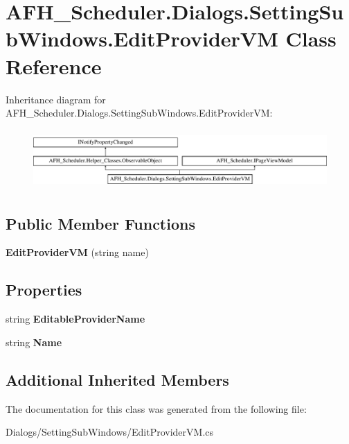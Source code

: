 \section{A\+F\+H\+\_\+\+Scheduler.\+Dialogs.\+Setting\+Sub\+Windows.\+Edit\+Provider\+VM Class Reference}
\label{class_a_f_h___scheduler_1_1_dialogs_1_1_setting_sub_windows_1_1_edit_provider_v_m}
Inheritance diagram for A\+F\+H\+\_\+\+Scheduler.\+Dialogs.\+Setting\+Sub\+Windows.\+Edit\+Provider\+VM\+:\begin{figure}[H]
\begin{center}
\leavevmode
\includegraphics[height=2.301370cm]{class_a_f_h___scheduler_1_1_dialogs_1_1_setting_sub_windows_1_1_edit_provider_v_m}
\end{center}
\end{figure}
\subsection*{Public Member Functions}
\begin{DoxyCompactItemize}
\item 
\mbox{\label{class_a_f_h___scheduler_1_1_dialogs_1_1_setting_sub_windows_1_1_edit_provider_v_m_a44ff3606b1009d3b48a14e4bc28a5d91}} 
{\bfseries Edit\+Provider\+VM} (string name)
\end{DoxyCompactItemize}
\subsection*{Properties}
\begin{DoxyCompactItemize}
\item 
\mbox{\label{class_a_f_h___scheduler_1_1_dialogs_1_1_setting_sub_windows_1_1_edit_provider_v_m_a9d20ee54fea237ba92496c53a42af3b3}} 
string {\bfseries Editable\+Provider\+Name}\hspace{0.3cm}{\ttfamily  [get, set]}
\item 
\mbox{\label{class_a_f_h___scheduler_1_1_dialogs_1_1_setting_sub_windows_1_1_edit_provider_v_m_acd99d019235ec5613cb436413a1c26b1}} 
string {\bfseries Name}\hspace{0.3cm}{\ttfamily  [get]}
\end{DoxyCompactItemize}
\subsection*{Additional Inherited Members}


The documentation for this class was generated from the following file\+:\begin{DoxyCompactItemize}
\item 
Dialogs/\+Setting\+Sub\+Windows/Edit\+Provider\+V\+M.\+cs\end{DoxyCompactItemize}
